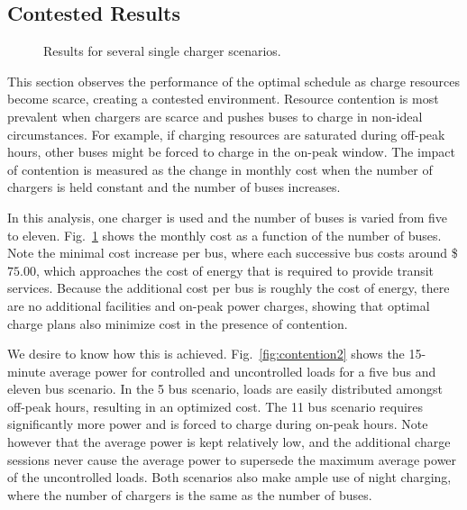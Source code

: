 \subsection{Contested Results}
\begin{figure}
	\centering
	\caption{Results for several single charger scenarios.}
	\label{fig:contention1}
\end{figure} 
This section observes the performance of the optimal schedule as charge resources become scarce, creating a contested environment. Resource contention is most prevalent when chargers are scarce and pushes buses to charge in non-ideal circumstances.  For example, if charging resources are saturated during off-peak hours, other buses might be forced to charge in the on-peak window. The impact of contention is measured as the change in monthly cost when the number of chargers is held constant and the number of buses increases. 
\par In this analysis, one charger is used and the number of buses is varied from five to eleven. Fig.~\ref{fig:contention1} shows the monthly cost as a function of the number of buses. Note the minimal cost increase per bus, where each successive bus costs around \$$75.00$, which approaches the cost of energy that is required to provide transit services.  Because the additional cost per bus is roughly the cost of energy, there are no additional facilities and on-peak power charges, showing that optimal charge plans also minimize cost in the presence of contention.  
\par We desire to know how this is achieved. Fig.~\ref{fig:contention2} shows the 15-minute average power for controlled and uncontrolled loads for a five bus and eleven bus scenario. In the 5 bus scenario, loads are easily distributed amongst off-peak hours, resulting in an optimized cost.  The 11 bus scenario requires significantly more power and is forced to charge during on-peak hours.  Note however that the average power is kept relatively low, and the additional charge sessions never cause the average power to supersede the maximum average power of the uncontrolled loads. Both scenarios also make ample use of night charging, where the number of chargers is the same as the number of buses.  
\begin{figure*}
	\centering
	\caption{Comparison of the loads for a 5 and 11 bus scenario with one overhead charger.}
	\label{fig:contention2}
\end{figure*}
